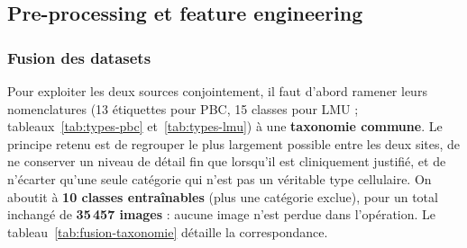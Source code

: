 \subsection{Pre-processing et feature engineering}
\label{sec:pre-processing-feature-engineering}
\subsubsection{Fusion des datasets}

Pour exploiter les deux sources conjointement, il faut d’abord ramener leurs nomenclatures (13 étiquettes pour PBC, 15 classes pour LMU ; tableaux~\ref{tab:types-pbc} et~\ref{tab:types-lmu}) à une \textbf{taxonomie commune}.
Le principe retenu est de regrouper le plus largement possible entre les deux sites, de ne conserver un niveau de détail fin que lorsqu’il est cliniquement justifié, et de n’écarter qu’une seule catégorie qui n’est pas un véritable type cellulaire.
On aboutit à \textbf{10 classes entraînables} (plus une catégorie exclue), pour un total inchangé de \textbf{35\,457 images} : aucune image n’est perdue dans l’opération.
Le tableau~\ref{tab:fusion-taxonomie} détaille la correspondance.

